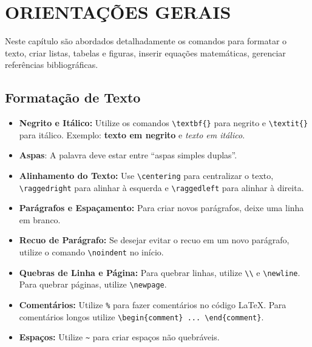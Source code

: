 \chapter{ORIENTAÇÕES GERAIS}
\label{chap:orientacoesGerais}

Neste capítulo são abordados detalhadamente os comandos para formatar o texto, criar listas, tabelas e figuras, inserir equações matemáticas, gerenciar referências bibliográficas.

\section{Formatação de Texto}
\label{sec:formatacaoTexto}

\begin{itemize}
    \item \textbf{Negrito e Itálico:} Utilize os comandos \verb|\textbf{}| para negrito e \verb|\textit{}| para itálico. Exemplo: \textbf{texto em negrito} e \textit{texto em itálico}.
    
    \item \textbf{Aspas}: A palavra deve estar entre ``aspas simples duplas''.
    
    \item \textbf{Alinhamento do Texto:} Use \verb|\centering| para centralizar o texto, \verb|\raggedright| para alinhar à esquerda e \verb|\raggedleft| para alinhar à direita.
    
    \item \textbf{Parágrafos e Espaçamento:} Para criar novos parágrafos, deixe uma linha em branco.
    
    \item \textbf{Recuo de Parágrafo:} Se desejar evitar o recuo em um novo parágrafo, utilize o comando \verb|\noindent| no início.
    
    \item \textbf{Quebras de Linha e Página:} Para quebrar linhas, utilize \verb|\\| e \verb|\newline|. Para quebrar páginas, utilize \verb|\newpage|.
    
    \item \textbf{Comentários:} Utilize \verb|%| para fazer comentários no código LaTeX. Para comentários longos utilize  \verb|\begin{comment} ... \end{comment}|.
    
    \item \textbf{Espaços:} Utilize \verb|~| para criar espaços não quebráveis.

\end{itemize}

